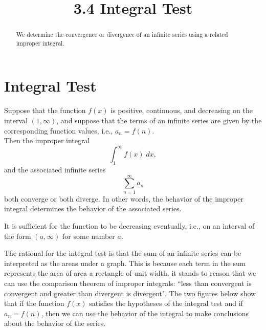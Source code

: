 \documentclass{ximera}
\title{3.4 Integral Test}
\begin{document}
\begin{abstract}
We determine the convergence or divergence of an infinite series using a related improper integral.
\end{abstract}

\maketitle

\section{Integral Test}

\begin{theorem}
Suppose that the function $f(x)$ is positive, continuous, and decreasing on the interval $(1, \infty)$, and 
suppose that the terms of an infinite series
are given by the corresponding function values, i.e., $a_n = f(n)$. \\
Then the improper integral
\[
\int_1^\infty f(x) \; dx,
\]
and the associated infinite series
\[
\sum_{n=1}^\infty a_n
\]
both converge or both diverge. In other words, the behavior of the improper integral 
determines the behavior of the associated series.
\end{theorem}

\begin{remark}
It is sufficient for the function to be decreasing eventually, i.e., on an interval of the form $(a, \infty)$
for some number $a$.
\end{remark}

The rational for the integral test is that the sum of an infinite series can be interpreted as the areas under a graph.
This is because each term in the sum represents the area of area a rectangle of unit width, 
it stands to reason that we can use the comparison theorem of improper integrals: ``less than convergent is convergent and greater 
than divergent is divergent". The two figures below show that if 
the function $f(x)$ satisfies the hypotheses of the integral test and if  $a_n = f(n)$, then we can use the behavior of the integral to make conclusions about the behavior of the series.
\end{document}
